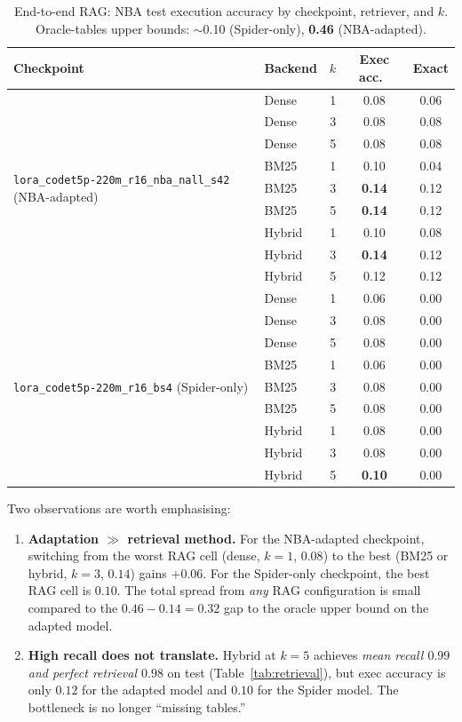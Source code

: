\documentclass[11pt,a4paper]{article}
\newcommand{\bestckpt}{\texttt{lora\_codet5p-220m\_r16\_nba\_nall\_s42}}
\newcommand{\spiderckpt}{\texttt{lora\_codet5p-220m\_r16\_bs4}}
\begin{document}
\begin{table}[h]
\centering
\caption{End-to-end RAG: NBA test execution accuracy by checkpoint, retriever,
and $k$. Oracle-tables upper bounds: $\sim$0.10 (Spider-only),
\textbf{0.46} (NBA-adapted).}
\label{tab:rag-e2e}
\small
\begin{tabular}{l l r c c}
\toprule
Checkpoint & Backend & $k$ & Exec acc.\ & Exact \\
\midrule
\multirow{9}{*}{\bestckpt{} (NBA-adapted)}
    & Dense  & 1 & 0.08 & 0.06 \\
    & Dense  & 3 & 0.08 & 0.08 \\
    & Dense  & 5 & 0.08 & 0.08 \\
    & BM25   & 1 & 0.10 & 0.04 \\
    & BM25   & 3 & \textbf{0.14} & 0.12 \\
    & BM25   & 5 & \textbf{0.14} & 0.12 \\
    & Hybrid & 1 & 0.10 & 0.08 \\
    & Hybrid & 3 & \textbf{0.14} & 0.12 \\
    & Hybrid & 5 & 0.12 & 0.12 \\
\midrule
\multirow{9}{*}{\spiderckpt{} (Spider-only)}
    & Dense  & 1 & 0.06 & 0.00 \\
    & Dense  & 3 & 0.08 & 0.00 \\
    & Dense  & 5 & 0.08 & 0.00 \\
    & BM25   & 1 & 0.06 & 0.00 \\
    & BM25   & 3 & 0.08 & 0.00 \\
    & BM25   & 5 & 0.08 & 0.00 \\
    & Hybrid & 1 & 0.08 & 0.00 \\
    & Hybrid & 3 & 0.08 & 0.00 \\
    & Hybrid & 5 & \textbf{0.10} & 0.00 \\
\bottomrule
\end{tabular}
\end{table}

Two observations are worth emphasising:

\begin{enumerate}[leftmargin=*,itemsep=2pt]
\item \textbf{Adaptation $\gg$ retrieval method.} For the NBA-adapted
      checkpoint, switching from the worst RAG cell (dense, $k=1$, $0.08$) to
      the best (BM25 or hybrid, $k=3$, $0.14$) gains $+0.06$. For the
      Spider-only checkpoint, the best RAG cell is $0.10$. The total spread
      from \emph{any} RAG configuration is small compared to the
      $0.46-0.14 = 0.32$ gap to the oracle upper bound on the
      adapted model.
\item \textbf{High recall does not translate.} Hybrid at $k=5$ achieves
      \emph{mean recall $0.99$ and perfect retrieval $0.98$} on test
      (Table~\ref{tab:retrieval}), but exec accuracy is only $0.12$ for the
      adapted model and $0.10$ for the Spider model. The bottleneck is no
      longer ``missing tables.''
\end{enumerate}
\end{document}
